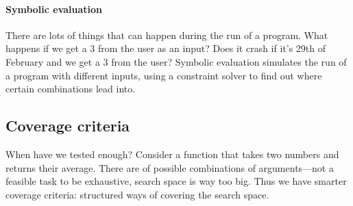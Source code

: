 \paragraph{Symbolic evaluation }

There are lots of things that can happen during the run of a
program. What happens if we get a 3 from the user as an input? Does it
crash if it's 29th of February and we get a 3 from the user?  Symbolic 
evaluation simulates the run of a program with different inputs, using 
a constraint solver to find out where certain combinations lead into.


\subsection{Coverage criteria}

When have we tested enough? Consider a function that takes two numbers
and returns their average. There are  of possible
combinations of arguments---not a feasible task to be
exhaustive, search space is way too big. Thus we have smarter coverage
criteria: structured ways of covering the search space.






